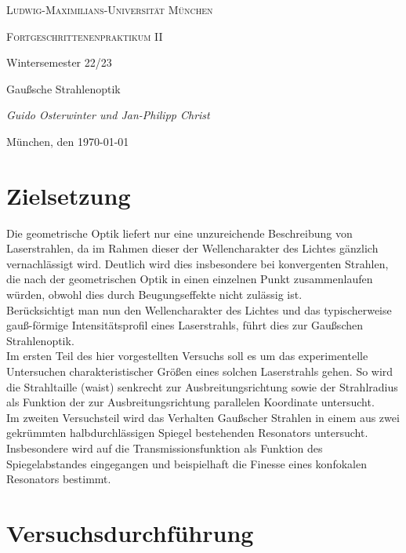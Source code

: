 \documentclass[11pt,a4paper,oneside]{scrartcl}
\begin{document}
\begin{titlepage}
	\centering
	{\scshape\LARGE Ludwig-Maximilians-Universität \linebreak München \par}
	\vspace{1cm}
	{\scshape\Large Fortgeschrittenenpraktikum II \par Wintersemester 22/23 \par}
	\vspace{1.5cm}
	{\huge\bfseries \par  Gaußsche Strahlenoptik\par}
	\vspace{2cm}
	{\Large\itshape Guido Osterwinter und Jan-Philipp Christ \par}
	\vfill
	{\large München, den \today\par}
\end{titlepage}

\tableofcontents
\newpage
\section{Zielsetzung}
Die geometrische Optik liefert nur eine unzureichende Beschreibung von Laserstrahlen, da im Rahmen dieser der Wellencharakter des Lichtes gänzlich vernachlässigt wird. Deutlich wird dies insbesondere bei konvergenten Strahlen, die nach der geometrischen Optik in einen einzelnen Punkt zusammenlaufen würden, obwohl dies durch Beugungseffekte nicht zulässig ist. \\
Berücksichtigt man nun den Wellencharakter des Lichtes und das typischerweise gauß-förmige Intensitätsprofil eines Laserstrahls, führt dies zur Gaußschen Strahlenoptik. \\
Im ersten Teil des hier vorgestellten Versuchs soll es um das experimentelle Untersuchen charakteristischer Größen eines solchen Laserstrahls gehen. So wird die Strahltaille (waist) senkrecht zur Ausbreitungsrichtung sowie der Strahlradius als Funktion der zur Ausbreitungsrichtung parallelen Koordinate untersucht.\\
Im zweiten Versuchsteil wird das Verhalten Gaußscher Strahlen in einem aus zwei gekrümmten halbdurchlässigen Spiegel bestehenden Resonators untersucht. Insbesondere wird auf die Transmissionsfunktion als Funktion des Spiegelabstandes eingegangen und beispielhaft die Finesse eines konfokalen Resonators bestimmt. 
\section{Versuchsdurchführung}
\end{document}
